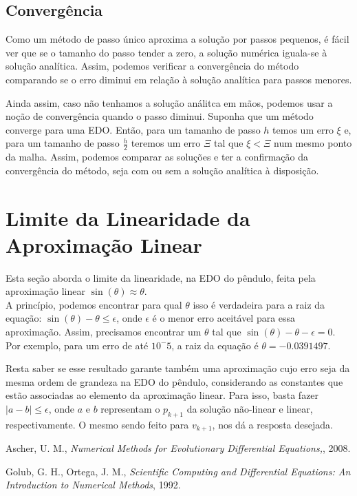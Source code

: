 \documentclass{amsart}
\theoremstyle{definition}
\theoremstyle{remark}
\numberwithin{equation}{section}
\begin{document}
\subsection{Convergência}
Como um método de passo único aproxima a solução por passos pequenos, é fácil ver que se o tamanho do passo tender a zero, a solução numérica iguala-se à solução analítica. Assim, podemos verificar a convergência do método comparando se o erro diminui em relação à solução analítica para passos menores. 

Ainda assim, caso não tenhamos a solução análitca em mãos, podemos usar a noção de convergência quando o passo diminui. Suponha que um método converge para uma EDO. Então, para um tamanho de passo $h$ temos um erro $\xi$ e, para um tamanho de passo $\frac{h}{2}$ teremos um erro $\Xi$ tal que $\xi < \Xi$ num mesmo ponto da malha. Assim, podemos comparar as soluções e ter a confirmação da convergência do método, seja com ou sem a solução analítica à disposição. \\
 
\section{Limite da Linearidade da Aproximação Linear}
Esta seção aborda o limite da linearidade, na EDO do pêndulo, feita pela aproximação linear $\sin(\theta)\approx \theta$. \\
A princípio, podemos encontrar para qual $\theta$ isso é verdadeira para a raiz da equação: $\sin(\theta) - \theta \leq \epsilon$, onde $\epsilon$ é o menor erro aceitável para essa aproximação. Assim, precisamos encontrar um $\theta$ tal que $\sin(\theta) - \theta - \epsilon = 0$. Por exemplo, para um erro de até $10^-5$, a raiz da equação é $\theta = -0.0391497$.

Resta saber se esse resultado garante também uma aproximação cujo erro seja da mesma ordem de grandeza na EDO do pêndulo, considerando as constantes que estão associadas ao elemento da aproximação linear. Para isso, basta fazer $|a - b| \leq \epsilon$, onde $a$ e $b$ representam o $p_{k+1}$ da solução não-linear e linear, respectivamente. O mesmo sendo feito para $v_{k+1}$, nos dá a resposta desejada. \\


\begin{thebibliography}{10}

 Ascher, U. M., \textit{Numerical Methods for Evolutionary Differential Equations,}, 2008.

 Golub, G. H., Ortega, J. M., \textit{Scientific Computing and Differential Equations: An Introduction to Numerical Methods}, 1992.

\end{thebibliography}
\end{document}
